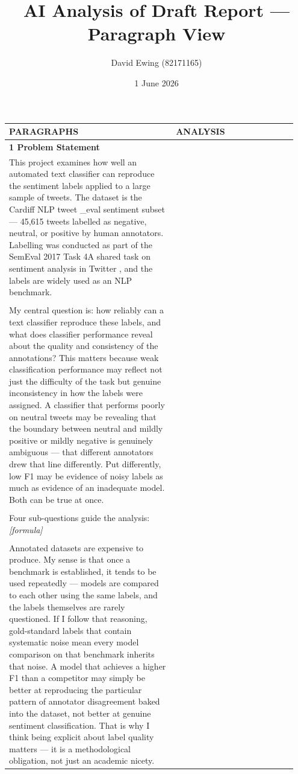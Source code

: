 \documentclass[11pt]{article}
\title{AI Analysis of Draft Report --- Paragraph View}
\author{David Ewing (82171165)}
\date{1 June 2026}
\begin{document}
\maketitle
\thispagestyle{empty}
\newpage

\setlength{\LTleft}{0pt}
\setlength{\LTright}{0pt}
\begin{longtable}{|p{0.55\linewidth}|p{0.40\linewidth}|}
\hline
\centering\textbf{PARAGRAPHS} & \centering\textbf{ANALYSIS} \tabularnewline[2pt]
\hline
\endhead
\multicolumn{2}{|l|}{\textbf{1 Problem Statement}} \\[2pt]
\hline
This project examines how well an automated text classifier can reproduce the sentiment labels applied to a large sample of tweets. The dataset is the Cardiff NLP tweet \_eval sentiment subset --- 45,615 tweets labelled as negative, neutral, or positive by human annotators. Labelling was conducted as part of the SemEval 2017 Task 4A shared task on sentiment analysis in Twitter , and the labels are widely used as an NLP benchmark. & \\[2pt]
\hline
\rule{0pt}{3.5cm} & \\
\hline
My central question is: how reliably can a text classifier reproduce these labels, and what does classifier performance reveal about the quality and consistency of the annotations? This matters because weak classification performance may reflect not just the difficulty of the task but genuine inconsistency in how the labels were assigned. A classifier that performs poorly on neutral tweets may be revealing that the boundary between neutral and mildly positive or mildly negative is genuinely ambiguous --- that different annotators drew that line differently. Put differently, low F1 may be evidence of noisy labels as much as evidence of an inadequate model. Both can be true at once. & \\[2pt]
\hline
\rule{0pt}{3.5cm} & \\
\hline
Four sub-questions guide the analysis: \textit{[formula]} & \\[2pt]
\hline
\rule{0pt}{3.5cm} & \\
\hline
Annotated datasets are expensive to produce. My sense is that once a benchmark is established, it tends to be used repeatedly --- models are compared to each other using the same labels, and the labels themselves are rarely questioned. If I follow that reasoning, gold-standard labels that contain systematic noise mean every model comparison on that benchmark inherits that noise. A model that achieves a higher F1 than a competitor may simply be better at reproducing the particular pattern of annotator disagreement baked into the dataset, not better at genuine sentiment classification. That is why I think being explicit about label quality matters --- it is a methodological obligation, not just an academic nicety. & \\[2pt]

\end{longtable}
\end{document}
